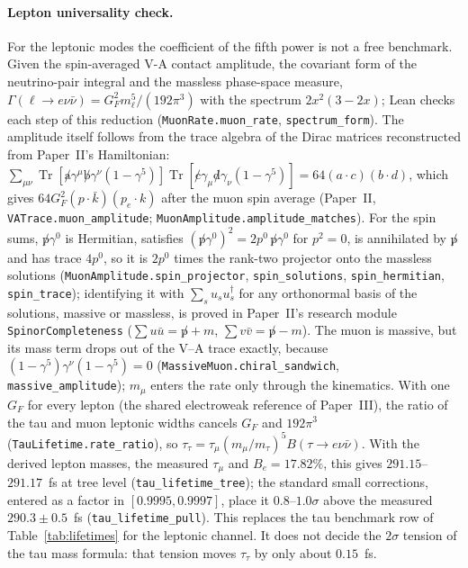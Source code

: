 \paragraph{Lepton universality check.} For the leptonic modes the coefficient of the fifth power is not a free benchmark. Given the spin-averaged V-A contact amplitude, the covariant form of the neutrino-pair integral and the massless phase-space measure, $\Gamma(\ell\to e\nu\bar\nu)=G_F^2m_\ell^5/(192\pi^3)$ with the spectrum $2x^2(3-2x)$; Lean checks each step of this reduction (\texttt{MuonRate.muon\_rate}, \texttt{spectrum\_form}). The amplitude itself follows from the trace algebra of the Dirac matrices reconstructed from Paper~II's Hamiltonian: $\sum_{\mu\nu}\operatorname{Tr}[\not a\gamma^\mu\not b\gamma^\nu(1-\gamma^5)]\operatorname{Tr}[\not c\gamma_\mu\not d\gamma_\nu(1-\gamma^5)]=64(a\cdot c)(b\cdot d)$, which gives $64G_F^2(p\cdot\bar k)(p_e\cdot k)$ after the muon spin average (Paper~II, \texttt{VATrace.muon\_amplitude}; \texttt{MuonAmplitude.amplitude\_matches}). For the spin sums, $\not p\gamma^0$ is Hermitian, satisfies $(\not p\gamma^0)^2=2p^0\,\not p\gamma^0$ for $p^2=0$, is annihilated by $\not p$ and has trace $4p^0$, so it is $2p^0$ times the rank-two projector onto the massless solutions (\texttt{MuonAmplitude.spin\_projector}, \texttt{spin\_solutions}, \texttt{spin\_hermitian}, \texttt{spin\_trace}); identifying it with $\sum_s u_su_s^\dagger$ for any orthonormal basis of the solutions, massive or massless, is proved in Paper~II's research module \texttt{SpinorCompleteness} ($\sum u\bar u=\not p+m$, $\sum v\bar v=\not p-m$). The muon is massive, but its mass term drops out of the V--A trace exactly, because $(1-\gamma^5)\gamma^\nu(1-\gamma^5)=0$ (\texttt{MassiveMuon.chiral\_sandwich}, \texttt{massive\_amplitude}); $m_\mu$ enters the rate only through the kinematics. With one $G_F$ for every lepton (the shared electroweak reference of Paper~III), the ratio of the tau and muon leptonic widths cancels $G_F$ and $192\pi^3$ (\texttt{TauLifetime.rate\_ratio}), so $\tau_\tau=\tau_\mu(m_\mu/m_\tau)^5B(\tau\to e\nu\bar\nu)$. With the derived lepton masses, the measured $\tau_\mu$ and $B_e=17.82\%$, this gives $291.15$--$291.17$~fs at tree level (\texttt{tau\_lifetime\_tree}); the standard small corrections, entered as a factor in $[0.9995,0.9997]$, place it $0.8$--$1.0\sigma$ above the measured $290.3\pm0.5$~fs (\texttt{tau\_lifetime\_pull}). This replaces the tau benchmark row of Table~\ref{tab:lifetimes} for the leptonic channel. It does not decide the $2\sigma$ tension of the tau mass formula: that tension moves $\tau_\tau$ by only about $0.15$~fs.

